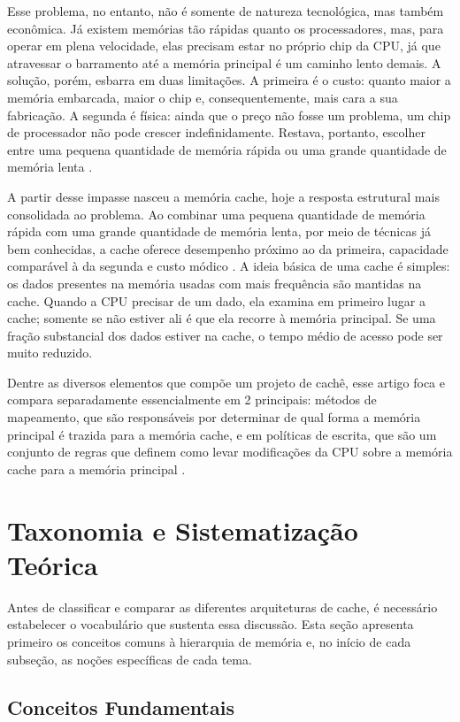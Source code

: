 \documentclass[12pt]{article}
\begin{document}
Esse problema, no entanto, não é somente de natureza tecnológica, mas
também econômica. Já existem memórias tão rápidas quanto os processadores,
mas, para operar em plena velocidade, elas precisam estar no próprio chip
da CPU, já que atravessar o barramento até a memória principal é um caminho
lento demais. A solução, porém, esbarra em duas limitações. A primeira é o
custo: quanto maior a memória embarcada, maior o chip e, consequentemente,
mais cara a sua fabricação. A segunda é física: ainda que o preço não fosse
um problema, um chip de processador não pode crescer indefinidamente. Restava, portanto,
escolher entre uma pequena quantidade de memória rápida ou uma grande quantidade
de memória lenta \cite{tanenbaum2013}.

A partir desse impasse nasceu a memória cache, hoje a resposta estrutural
mais consolidada ao problema. Ao combinar uma pequena quantidade de memória
rápida com uma grande quantidade de memória lenta, por meio de técnicas já
bem conhecidas, a cache oferece desempenho próximo ao da primeira, capacidade
comparável à da segunda e custo módico \cite{tanenbaum2013}. A ideia básica de uma cache é simples:
os dados presentes na memória usadas com mais frequência são mantidas na cache.
Quando a CPU precisar de um dado, ela examina em primeiro lugar a cache; somente
se não estiver ali é que ela recorre à memória principal. Se uma fração substancial
dos dados estiver na cache, o tempo médio de acesso pode ser muito reduzido.

Dentre as diversos elementos que compõe um projeto de cachê, esse artigo
foca e compara separadamente essencialmente em 2 principais: métodos de mapeamento,
que são responsáveis por determinar de qual forma a memória principal é trazida
para a memória cache, e em políticas de escrita, que são um conjunto de regras
que definem como levar modificações da CPU sobre a memória cache para a memória
principal \cite{stallings2017}.

\section{Taxonomia e Sistematização Teórica}

Antes de classificar e comparar as diferentes arquiteturas de cache,
é necessário estabelecer o vocabulário que sustenta essa discussão.
Esta seção apresenta primeiro os conceitos comuns à hierarquia de memória
e, no início de cada subseção, as noções específicas de cada tema.

\subsection{Conceitos Fundamentais}
\end{document}
